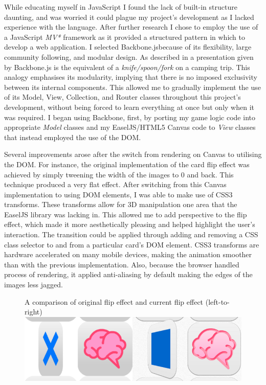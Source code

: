\documentclass[final]{cmpreport}
\begin{document}
While educating myself in JavaScript I found the lack of built-in structure daunting, and was worried it could plague my project's development as I lacked experience with the language. After further research I chose to employ the use of a JavaScript \textit{MV*} framework as it provided a structured pattern in which to develop a web application. I selected Backbone.js\footnotemark[28] because of its flexibility, large community following, and modular design. As described in a presentation given by \citet{Bull} Backbone.js is the equivalent of a \textit{knife/spoon/fork} on a camping trip. This analogy emphasises its modularity, implying that there is no imposed exclusivity between its internal components. This allowed me to gradually implement the use of its Model, View, Collection, and Router classes throughout this project's development, without being forced to learn everything at once but only when it was required. I began using Backbone, first, by porting my game logic code into appropriate \textit{Model} classes and my EaselJS/HTML5 Canvas code to \textit{View} classes that instead employed the use of the DOM.


Several improvements arose after the switch from rendering on Canvas to utilising the DOM. For instance, the original implementation of the card flip effect was achieved by simply tweening the width of the images to 0 and back. This technique produced a very flat effect. After switching from this Canvas implementation to using DOM elements, I was able to make use of CSS3 transforms. These transforms allow for 3D manipulation one area that the EaselJS library was lacking in. This allowed me to add perspective to the flip effect, which made it more aesthetically pleasing and helped highlight the user's interaction. The transition could be applied through adding and removing a CSS class selector to and from a particular card's DOM element. CSS3 transforms are hardware accelerated on many mobile devices, making the animation smoother than with the previous implementation. Also, because the browser handled process of rendering, it applied anti-aliasing by default making the edges of the images less jagged.

\begin{figure}[h!]{A comparison of original flip effect and current flip effect (left-to-right)\label{transforms}}
  \includegraphics[width=1.0\textwidth]{transforms.png}
\end{figure}
\end{document}
